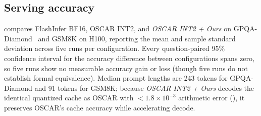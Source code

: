 \subsection{Serving accuracy}
\label{sec:eval-serving-accuracy}



 compares FlashInfer BF16, OSCAR INT2, and \emph{OSCAR INT2 + Ours} on GPQA-Diamond~\cite{rein2023gpqa} and GSM8K on H100, reporting the mean and sample standard deviation across five runs per configuration.
Every question-paired 95\% confidence interval for the accuracy difference between configurations spans zero, so five runs show no measurable accuracy gain or loss (though five runs do not establish formal equivalence).
Median prompt lengths are 243 tokens for GPQA-Diamond and 91 tokens for GSM8K; because \emph{OSCAR INT2 + Ours} decodes the identical quantized cache as OSCAR with $<1.8\times10^{-3}$ arithmetic error (), it preserves OSCAR's cache accuracy while accelerating decode.
